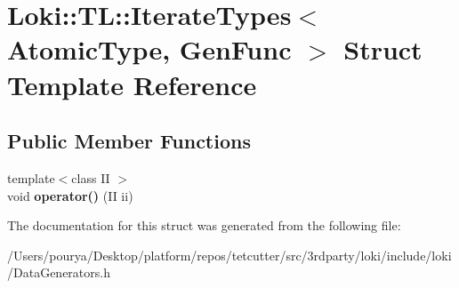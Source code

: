 \hypertarget{structLoki_1_1TL_1_1IterateTypes}{}\section{Loki\+:\+:T\+L\+:\+:Iterate\+Types$<$ Atomic\+Type, Gen\+Func $>$ Struct Template Reference}
\label{structLoki_1_1TL_1_1IterateTypes}
\subsection*{Public Member Functions}
\begin{DoxyCompactItemize}
\item 
\hypertarget{structLoki_1_1TL_1_1IterateTypes_aab5d39252e8270e34eddd443e4ba578b}{}{\footnotesize template$<$class I\+I $>$ }\\void {\bfseries operator()} (I\+I ii)\label{structLoki_1_1TL_1_1IterateTypes_aab5d39252e8270e34eddd443e4ba578b}

\end{DoxyCompactItemize}


The documentation for this struct was generated from the following file\+:\begin{DoxyCompactItemize}
\item 
/\+Users/pourya/\+Desktop/platform/repos/tetcutter/src/3rdparty/loki/include/loki/Data\+Generators.\+h\end{DoxyCompactItemize}
